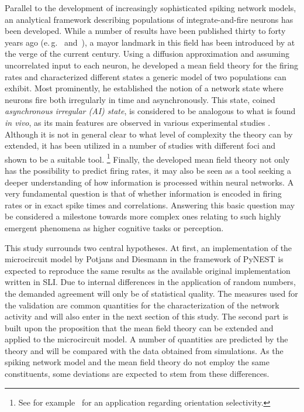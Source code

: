 Parallel to the development of increasingly sophisticated spiking network models, 
an analytical framework describing populations of integrate-and-fire neurons has 
been developed. While a number of results have been published thirty to forty years ago
(e.\,g.~ and~), a mayor landmark
in this field has been introduced by  at the verge of the current century.
Using a diffusion approximation and assuming uncorrelated input to each neuron, he
developed a mean field theory for the firing rates and characterized different states
a generic model of two populations can exhibit. Most prominently, he established the 
notion of a network state where neurons fire both irregularly in time and asynchronously. 
This state, coined \textit{asynchronous irregular (AI) state}, is considered to be 
analogous to what is found \textit{in vivo}, as its main features are observed in various 
experimental studies
.
Although it is not in general clear to what level of complexity the theory can by extended, 
it has been utilized in a number of studies with different 
foci and shown to be a suitable tool.%
\footnote{
    See for example~ for an application 
    regarding orientation selectivity.
} Finally, the developed mean field theory not only has the possibility to predict 
firing rates, it may also be seen as a tool seeking a deeper understanding of 
how information is processed within neural networks. A very fundamental
question is that of whether information is encoded in firing rates 
or in exact spike times and correlations. Answering this basic question may be considered
a milestone  towards more complex ones relating to such
highly emergent phenomena as higher cognitive tasks or perception. 

This study surrounds two central
hypotheses. At first, an implementation of the microcircuit model by
Potjans and Diesmann in the framework of PyNEST is expected to reproduce the 
same results as the available original implementation written in SLI. Due to
internal differences in the application of random numbers, the demanded agreement 
will only be of statistical quality. The measures used for the validation 
are common quantities for the characterization of the network 
activity and will also enter in the next section of this study. 
The second part is built upon the proposition that the mean field theory 
can be extended and applied to the microcircuit model. 
A number of quantities are predicted by the theory and will 
be compared with the data obtained from simulations. As the spiking network model 
and the mean field theory do not employ the same constituents, some 
deviations are expected to stem from these differences. 

